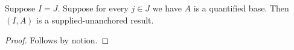 

\begin{theorem}\label{supplied_equality_is_not_an_alias}
    Suppose $I=J$.
    Suppose for every $j\in J$ we have $A$ is a quantified base.
    Then $(I,A)$ is a supplied-unanchored result.
\end{theorem}
\begin{proof}
    Follows by notion.
\end{proof}
